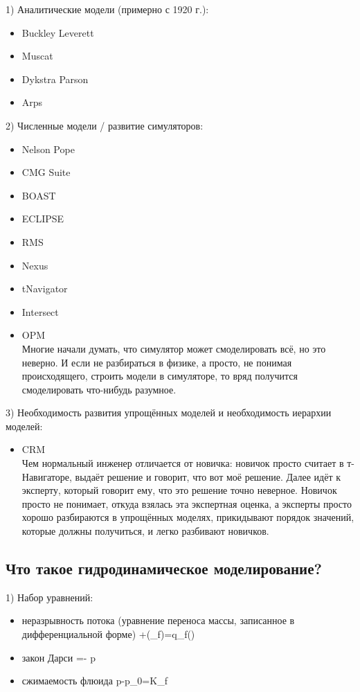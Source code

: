 \documentclass[main.tex]{subfiles}
\begin{document}
1) Аналитические модели (примерно с 1920 г.):
\begin{itemize}
	\item Buckley Leverett
	\item Muscat
	\item Dykstra Parson
	\item Arps
\end{itemize}
2) Численные модели / развитие симуляторов:
\begin{itemize}
	\item Nelson Pope
	\item CMG Suite
	\item BOAST
	\item ECLIPSE
	\item RMS
	\item Nexus
	\item tNavigator
	\item Intersect
	\item OPM \\
	Многие начали думать, что симулятор может смоделировать всё, но это неверно. И если не разбираться в физике, а просто, не понимая происходящего, строить модели в симуляторе, то вряд получится смоделировать что-нибудь разумное.
\end{itemize}

3) Необходимость развития упрощённых моделей и необходимость иерархии моделей:
\begin{itemize}
	\item CRM \\
	Чем нормальный инженер отличается от новичка: новичок просто считает в т-Навигаторе, выдаёт решение и говорит, что вот моё решение. Далее идёт к эксперту, который говорит ему, что это решение точно неверное. Новичок просто не понимает, откуда взялась эта экспертная оценка, а эксперты просто хорошо разбираются в упрощённых моделях, прикидывают порядок значений, которые должны получиться, и легко разбивают новичков.
\end{itemize}

\subsection{Что такое гидродинамическое моделирование?}
1) Набор уравнений:
\begin{itemize}
	\item неразрывность потока (уравнение переноса массы, записанное в дифференциальной форме)
	\beq\label{Continuity}
	+\pmb{\nabla}\cdot\left(\rho_f\varphi {}\right)=q_f()
	\eeq
	\item закон Дарси
	\beq\label{Darcy}
	=-\cdot\pmb{\nabla} p
	\eeq
	\item сжимаемость флюида
	\beq\label{Compressibility}
	p-p_0=K_f
	\eeq
\end{itemize}
\end{document}
